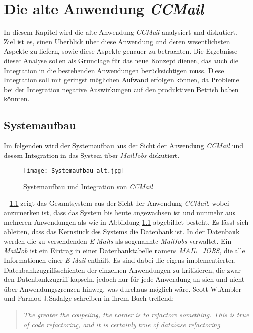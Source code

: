 \chapter{Die alte Anwendung \emph{CCMail}}
\label{cha:ccmail}
In diesem Kapitel wird die alte Anwendung \emph{CCMail} analysiert und diskutiert. Ziel ist es, einen Überblick über diese Anwendung und deren wesentlichsten Aspekte zu liefern, sowie diese Aspekte genauer zu betrachten. Die Ergebnisse dieser Analyse sollen als Grundlage für das neue Konzept dienen, das auch die Integration in die bestehenden Anwendungen berücksichtigen muss. Diese Integration soll mit geringst möglichen Aufwand erfolgen können, da Probleme bei der Integration negative Auswirkungen auf den produktiven Betrieb haben könnten. 

\section{Systemaufbau}
\label{sec:ccmail-systemaufbau}
Im folgenden wird der Systemaufbau aus der Sicht der Anwendung \emph{CCMail} und dessen Integration in das System über \emph{MailJobs} diskutiert. 
\begin{figure}[h]
\centering
\texttt{[image: Systemaufbau\_alt.jpg]} %
\caption{Systemaufbau und Integration von \emph{CCMail}}
\label{fig:ccmail-system-und-integration}
\end{figure}
\ \newpage
{} \ref{fig:ccmail-system-und-integration} zeigt das Gesamtsystem aus der Sicht der Anwendung \emph{CCMail}, wobei anzumerken ist, dass das System bis heute angewachsen ist und nunmehr aus mehreren Anwendungen als wie in Abbildung  \ref{fig:ccmail-system-und-integration} abgebildet besteht. Es lässt sich ableiten, dass das Kernstück des Systems die Datenbank ist. In der Datenbank werden die zu versendenden \emph{E-Mails} als sogenannte \emph{MailJobs} verwaltet. Ein \emph{MailJob} ist ein Eintrag in einer Datenbanktabelle namens \emph{MAIL\_JOBS}, die alle Informationen einer \emph{E-Mail} enthält. Es sind dabei die eigens implementierten Datenbankzugriffsschichten der einzelnen Anwendungen zu kritisieren, die zwar den Datenbankzugriff kapseln, jedoch nur für jede Anwendung an sich und nicht über Anwendungsgrenzen hinweg, was durchaus möglich wäre. Scott W.Ambler und Parmod J.Sadalge schreiben in ihrem Buch \cite[27]{refactoreDatabase} treffend:
\begin{quote}
\emph{The greater the coupeling, the harder is to refactore something. This is true of code refactoring, and it is certainly true of database refactoring}
\end{quote}
